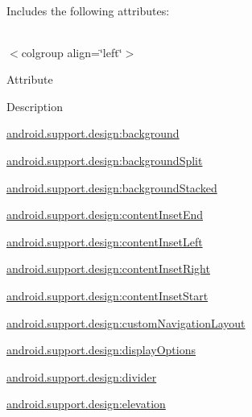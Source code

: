 Includes the following attributes\+:

\tabulinesep=1mm
\begin{longtabu} spread 0pt [c]{*{0}{|X[-1]}|}
\hline
\end{longtabu}
$<$colgroup align=\char`\"{}left\char`\"{}$>$ 

Attribute

Description 

{\ttfamily \hyperlink{classandroid_1_1support_1_1design_1_1R_1_1styleable_af9f6c6b106dc74dcd8336736d77ea6ba}{android.\+support.\+design\+:background}}

{\ttfamily \hyperlink{classandroid_1_1support_1_1design_1_1R_1_1styleable_abdc8b34e1d44d2cbe5ba60c429ff7c24}{android.\+support.\+design\+:background\+Split}}

{\ttfamily \hyperlink{classandroid_1_1support_1_1design_1_1R_1_1styleable_a6efbd40c875995ff58dd2e0851d81c20}{android.\+support.\+design\+:background\+Stacked}}

{\ttfamily \hyperlink{classandroid_1_1support_1_1design_1_1R_1_1styleable_afbb050c8aaf116cb242a091ccb7c5494}{android.\+support.\+design\+:content\+Inset\+End}}

{\ttfamily \hyperlink{classandroid_1_1support_1_1design_1_1R_1_1styleable_ac3914ae6a9e8b6f287ff67404ab1e659}{android.\+support.\+design\+:content\+Inset\+Left}}

{\ttfamily \hyperlink{classandroid_1_1support_1_1design_1_1R_1_1styleable_ae5f3307b79082ad75d0a290ff147ad9b}{android.\+support.\+design\+:content\+Inset\+Right}}

{\ttfamily \hyperlink{classandroid_1_1support_1_1design_1_1R_1_1styleable_a294d9e006ce1ce1efabd52d819b94bb8}{android.\+support.\+design\+:content\+Inset\+Start}}

{\ttfamily \hyperlink{classandroid_1_1support_1_1design_1_1R_1_1styleable_a89b2c279c58515d140466f1c0f360aa1}{android.\+support.\+design\+:custom\+Navigation\+Layout}}

{\ttfamily \hyperlink{classandroid_1_1support_1_1design_1_1R_1_1styleable_abddf5b63a010ab2e2078e9c46e36e80c}{android.\+support.\+design\+:display\+Options}}

{\ttfamily \hyperlink{classandroid_1_1support_1_1design_1_1R_1_1styleable_a3de1d07d052e4c273b08980969a62a70}{android.\+support.\+design\+:divider}}

{\ttfamily \hyperlink{classandroid_1_1support_1_1design_1_1R_1_1styleable_a8e93fa7b188ab181bc2723837301eaff}{android.\+support.\+design\+:elevation}}

